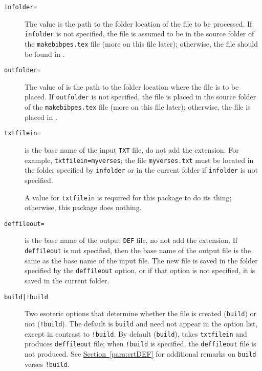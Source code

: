 \documentclass{article}
\begin{document}
\begin{description}

    \item[\texttt{infolder=}] The value  is
        the path to the folder location of the  file to be
        processed. If \texttt{infolder} is not specified, the  file is
        assumed to be in the source folder of the \texttt{makebibpes.tex}
        file (more on this file later); otherwise, the  file should be
        found in .

    \item[\texttt{outfolder=}] The value of
         is the path to the folder location where the 
        file is to be placed. If \texttt{outfolder} is not specified, the
         file is placed in the source folder of the
        \texttt{makebibpes.tex} file (more on this file later); otherwise,
        the  file is placed in .

    \item[\texttt{txtfilein=}] is the base name of
        the input \texttt{TXT} file, do not add the extension. For example,
        \texttt{txtfilein=myverses}; the file \texttt{myverses.txt} must be
        located in the folder specified by \texttt{infolder} or in the current folder
        if \texttt{infolder} is not specified.

        A value for \texttt{txtfilein} is required for this package to do its
        thing; otherwise, this package does nothing.

    \item[\texttt{deffileout=}] is the base name of
        the output \texttt{DEF} file, no not add the extension. If
        \texttt{deffileout} is not specified, then the base name of the
        output file is the same as the base name of the input file. The new
         file is saved in the folder specified by the
        \texttt{deffileout} option, or if that option is not specified, it
        is saved in the current folder.

    \item[\texttt{build|!build}] Two esoteric options that determine
        whether the  file is created (\texttt{build}) or not
        (\texttt{!build}). The default is \texttt{build} and need not
        appear in the option list, except in contrast to \texttt{!build}.
        By default (\texttt{build}),  takes \texttt{txtfilein}
        and produces \texttt{deffileout} file; when \texttt{!build} is
        specified, the \texttt{deffileout} file is not produced. See
        \hyperref[para:crtDEF]{Section~\ref*{para:crtDEF}} for additional remarks on \texttt{build}
        verses \texttt{!build}.


\end{description}
\end{document}
